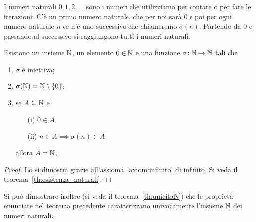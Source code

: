 I numeri naturali $0,1,2,\dots$ sono i numeri che utilizziamo per contare o per 
fare le iterazioni. C'è un primo numero naturale, che per noi sarà $0$ e poi
per ogni numero naturale $n$ ce n'è uno successivo che chiameremo $\sigma(n)$. 
Partendo da $0$ e passando al successivo si raggiungono tutti i numeri naturali.

\begin{theorem}
  \label{th:assiomi_peano}%
    \label{def:naturali}%
  \index{$\NN$}%
Esistono un insieme $\NN$, 
un elemento $0\in {\mathbb N}$ 
e una funzione $\sigma\colon {\mathbb N}\to{\mathbb N}$ tali che
\begin{enumerate}
  \item $\sigma$ è iniettiva;
  \item $\sigma({\mathbb N}) = {\mathbb N} \setminus{\left\{ 0 \right\}}$;
  \item se $A\subseteq {\mathbb N}$ e 
  \begin{enumerate} 
    \item[(i)] $0\in A$ 
    \item[(ii)] $n\in A \implies \sigma(n)\in A$
  \end{enumerate}
  allora $A={\mathbb N}$.
\end{enumerate}
\end{theorem}
%
\begin{proof}
  Lo si dimostra grazie all'assioma~\ref{axiom:infinito} di infinito.
  Si veda il teorema~\ref{th:esistenza_naturali}.
\end{proof}

Si può dimostrare inoltre (si veda il teorema~\ref{th:unicitaN}) che le proprietà 
enunciate nel teorema precedente caratterizzano univocamente l'insieme 
$\NN$ dei numeri naturali.

